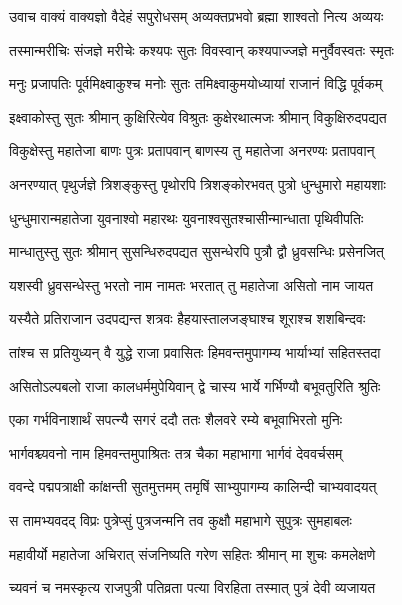 \twolineshloka
{उवाच वाक्यं वाक्यज्ञो वैदेहं सपुरोधसम्}
{अव्यक्तप्रभवो ब्रह्मा शाश्वतो नित्य अव्ययः} %

\twolineshloka
{तस्मान्मरीचिः संजज्ञे मरीचेः कश्यपः सुतः}
{विवस्वान् कश्यपाज्जज्ञे मनुर्वैवस्वतः स्मृतः} %

\twolineshloka
{मनुः प्रजापतिः पूर्वमिक्ष्वाकुश्च मनोः सुतः}
{तमिक्ष्वाकुमयोध्यायां राजानं विद्धि पूर्वकम्} %

\twolineshloka
{इक्ष्वाकोस्तु सुतः श्रीमान् कुक्षिरित्येव विश्रुतः}
{कुक्षेरथात्मजः श्रीमान् विकुक्षिरुदपद्यत} %

\twolineshloka
{विकुक्षेस्तु महातेजा बाणः पुत्रः प्रतापवान्}
{बाणस्य तु महातेजा अनरण्यः प्रतापवान्} %

\twolineshloka
{अनरण्यात् पृथुर्जज्ञे त्रिशङ्कुस्तु पृथोरपि}
{त्रिशङ्कोरभवत् पुत्रो धुन्धुमारो महायशाः} %

\twolineshloka
{धुन्धुमारान्महातेजा युवनाश्वो महारथः}
{युवनाश्वसुतश्चासीन्मान्धाता पृथिवीपतिः} %

\twolineshloka
{मान्धातुस्तु सुतः श्रीमान् सुसन्धिरुदपद्यत}
{सुसन्धेरपि पुत्रौ द्वौ ध्रुवसन्धिः प्रसेनजित्} %

\twolineshloka
{यशस्वी ध्रुवसन्धेस्तु भरतो नाम नामतः}
{भरतात् तु महातेजा असितो नाम जायत} %

\twolineshloka
{यस्यैते प्रतिराजान उदपद्यन्त शत्रवः}
{हैहयास्तालजङ्घाश्च शूराश्च शशबिन्दवः} %

\twolineshloka
{तांश्च स प्रतियुध्यन् वै युद्धे राजा प्रवासितः}
{हिमवन्तमुपागम्य भार्याभ्यां सहितस्तदा} %

\twolineshloka
{असितोऽल्पबलो राजा कालधर्ममुपेयिवान्}
{द्वे चास्य भार्ये गर्भिण्यौ बभूवतुरिति श्रुतिः} %

\twolineshloka
{एका गर्भविनाशार्थं सपत्न्यै सगरं ददौ}
{ततः शैलवरे रम्ये बभूवाभिरतो मुनिः} %

\twolineshloka
{भार्गवश्च्यवनो नाम हिमवन्तमुपाश्रितः}
{तत्र चैका महाभागा भार्गवं देववर्चसम्} %

\twolineshloka
{ववन्दे पद्मपत्राक्षी कांक्षन्ती सुतमुत्तमम्}
{तमृषिं साभ्युपागम्य कालिन्दी चाभ्यवादयत्} %

\twolineshloka
{स तामभ्यवदद् विप्रः पुत्रेप्सुं पुत्रजन्मनि}
{तव कुक्षौ महाभागे सुपुत्रः सुमहाबलः} %

\twolineshloka
{महावीर्यो महातेजा अचिरात् संजनिष्यति}
{गरेण सहितः श्रीमान् मा शुचः कमलेक्षणे} %

\twolineshloka
{च्यवनं च नमस्कृत्य राजपुत्री पतिव्रता}
{पत्या विरहिता तस्मात् पुत्रं देवी व्यजायत} %

